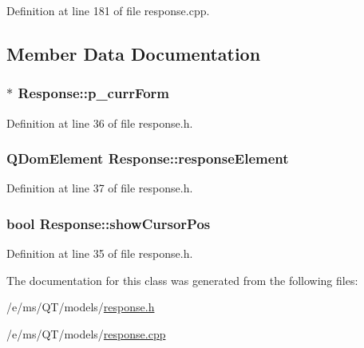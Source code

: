 Definition at line 181 of file response.cpp.



\subsection{Member Data Documentation}
\hypertarget{classResponse_a19e3d7596e4d1a3b2af194d8e543e988}{
\subsubsection[{p\_\-currForm}]{$\ast$ {\bf Response::p\_\-currForm}}}
\label{classResponse_a19e3d7596e4d1a3b2af194d8e543e988}


Definition at line 36 of file response.h.

\hypertarget{classResponse_a3c59e49d41a393ac663a472135dc899a}{
\subsubsection[{responseElement}]{\setlength{\rightskip}{0pt plus 5cm}QDomElement {\bf Response::responseElement}}}
\label{classResponse_a3c59e49d41a393ac663a472135dc899a}


Definition at line 37 of file response.h.

\hypertarget{classResponse_a170cc6ae7b4ad90d0c16fcdb6845415e}{
\subsubsection[{showCursorPos}]{\setlength{\rightskip}{0pt plus 5cm}bool {\bf Response::showCursorPos}}}
\label{classResponse_a170cc6ae7b4ad90d0c16fcdb6845415e}


Definition at line 35 of file response.h.



The documentation for this class was generated from the following files:\begin{DoxyCompactItemize}
\item 
/e/ms/QT/models/\hyperlink{response_8h}{response.h}\item 
/e/ms/QT/models/\hyperlink{response_8cpp}{response.cpp}\end{DoxyCompactItemize}
